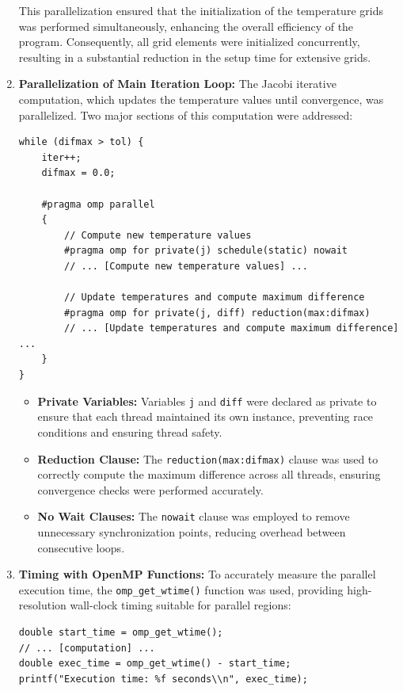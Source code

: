 \documentclass{article}
\begin{document}
\begin{enumerate}
    This parallelization ensured that the initialization of the temperature grids was performed simultaneously, enhancing the overall efficiency of the program. Consequently, all grid elements were initialized concurrently, resulting in a substantial reduction in the setup time for extensive grids.

    \item \textbf{Parallelization of Main Iteration Loop:} The Jacobi iterative computation, which updates the temperature values until convergence, was parallelized. Two major sections of this computation were addressed:

\begin{lstlisting}[style=CStyle, caption={Parallel Main Iteration Loop}]
while (difmax > tol) {
    iter++;
    difmax = 0.0;

    #pragma omp parallel
    {
        // Compute new temperature values
        #pragma omp for private(j) schedule(static) nowait
        // ... [Compute new temperature values] ...

        // Update temperatures and compute maximum difference
        #pragma omp for private(j, diff) reduction(max:difmax)
        // ... [Update temperatures and compute maximum difference] ...
    }
}
\end{lstlisting}

    \begin{itemize}
        \item \textbf{Private Variables:} Variables \texttt{j} and \texttt{diff} were declared as private to ensure that each thread maintained its own instance, preventing race conditions and ensuring thread safety.
        \item \textbf{Reduction Clause:} The \texttt{reduction(max:difmax)} clause was used to correctly compute the maximum difference across all threads, ensuring convergence checks were performed accurately.
        \item \textbf{No Wait Clauses:} The \texttt{nowait} clause was employed to remove unnecessary synchronization points, reducing overhead between consecutive loops.
    \end{itemize}

    \item \textbf{Timing with OpenMP Functions:} To accurately measure the parallel execution time, the \texttt{omp\_get\_wtime()} function was used, providing high-resolution wall-clock timing suitable for parallel regions:

\begin{lstlisting}[style=CStyle, caption={Timing with OpenMP Functions}]
double start_time = omp_get_wtime();
// ... [computation] ...
double exec_time = omp_get_wtime() - start_time;
printf("Execution time: %f seconds\\n", exec_time);
\end{lstlisting}


\end{enumerate}
\end{document}
